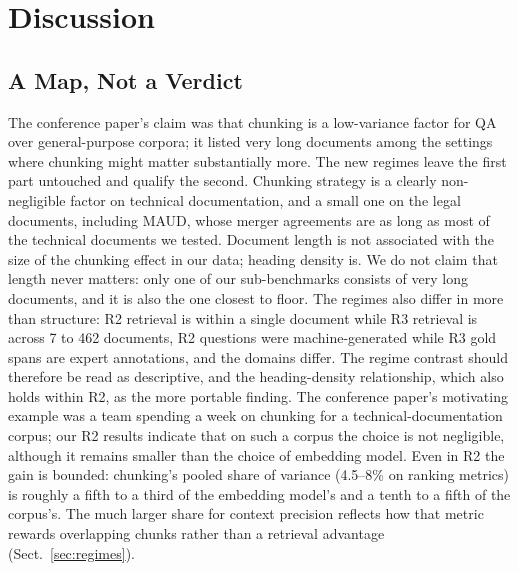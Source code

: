 \documentclass[runningheads]{llncs}
\begin{document}
\section{Discussion}
\label{sec:discussion}

\subsection{A Map, Not a Verdict}
The conference paper's claim was that chunking is a low-variance factor for QA over general-purpose corpora; it listed very long documents among the settings where chunking might matter substantially more. The new regimes leave the first part untouched and qualify the second. Chunking strategy is a clearly non-negligible factor on technical documentation, and a small one on the legal documents, including MAUD, whose merger agreements are as long as most of the technical documents we tested. Document length is not associated with the size of the chunking effect in our data; heading density is. We do not claim that length never matters: only one of our sub-benchmarks consists of very long documents, and it is also the one closest to floor. The regimes also differ in more than structure: R2 retrieval is within a single document while R3 retrieval is across 7 to 462 documents, R2 questions were machine-generated while R3 gold spans are expert annotations, and the domains differ. The regime contrast should therefore be read as descriptive, and the heading-density relationship, which also holds within R2, as the more portable finding. The conference paper's motivating example was a team spending a week on chunking for a technical-documentation corpus; our R2 results indicate that on such a corpus the choice is not negligible, although it remains smaller than the choice of embedding model. Even in R2 the gain is bounded: chunking's pooled share of variance (4.5--8\% on ranking metrics) is roughly a fifth to a third of the embedding model's and a tenth to a fifth of the corpus's. The much larger share for context precision reflects how that metric rewards overlapping chunks rather than a retrieval advantage (Sect.~\ref{sec:regimes}).
\end{document}
